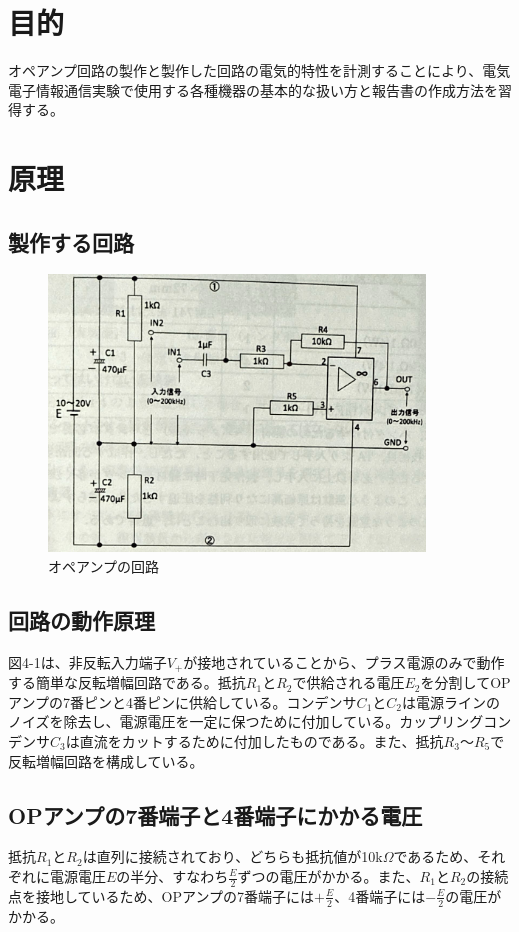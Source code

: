 \documentclass{jlreq}
\numberwithin{equation}{section}
\begin{document}
\section{目的}
オペアンプ回路の製作と製作した回路の電気的特性を計測することにより、電気電子情報通信実験で使用する各種機器の基本的な扱い方と報告書の作成方法を習得する。

\section{原理}
\subsection{製作する回路}

\begin{figure}[h]
  \centering
  \includegraphics[width=100mm]{kairozu.jpeg}
  \caption{オペアンプの回路}
\end{figure}

\subsection{回路の動作原理}
図4-1は、非反転入力端子\(V_+\)が接地されていることから、プラス電源のみで動作する簡単な反転増幅回路である。抵抗\(R_1\)と\(R_2\)で供給される電圧\(E_2\)を分割してOPアンプの7番ピンと4番ピンに供給している。コンデンサ\(C_1\)と\(C_2\)は電源ラインのノイズを除去し、電源電圧を一定に保つために付加している。カップリングコンデンサ\(C_3\)は直流をカットするために付加したものである。また、抵抗\(R_3\)〜\(R_5\)で反転増幅回路を構成している。

\subsection{OPアンプの7番端子と4番端子にかかる電圧}
抵抗\(R_1\)と\(R_2\)は直列に接続されており、どちらも抵抗値が10k\(\Omega\)であるため、それぞれに電源電圧\(E\)の半分、すなわち\(\frac{E}{2}\)ずつの電圧がかかる。また、\(R_1\)と\(R_2\)の接続点を接地しているため、OPアンプの7番端子には\(+\frac{E}{2}\)、4番端子には\(-\frac{E}{2}\)の電圧がかかる。
\end{document}
